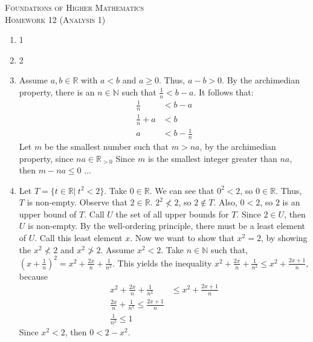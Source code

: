 \documentclass{article}
\theoremstyle{problem}
\theoremstyle{plain}
\theoremstyle{remark}
\begin{document}
\begin{center}
  \textsc{\Large Foundations of Higher Mathematics}\\[.3cm]
  \textsc{\Large Homework 12 (Analysis 1)}
\end{center}

\begin{enumerate}
\item 1
\item 2
\item 
  Assume $a,b \in \mathbb{R}$ with $a < b$ and $a \geq 0$. Thus, $a - b > 0$.
  By the archimedian property, there is an $n \in \mathbb{N}$ such that $\frac{1}{n} < b - a$.
  It follows that:
  \begin{align*}
    \frac{1}{n} &< b - a\\
    \frac{1}{n} + a &< b\\
    a &< b - \frac{1}{n}
  \end{align*}
  Let $m$ be the smallest number such that $m > na$, 
  by the archimedian property, since $na \in \mathbb{R}_{>0}$
  Since $m$ is the smallest integer greater than $na$, then $m - na \leq 0$
  ...
\item %
  Let $T = \{t \in \mathbb{R}|\ t^2 < 2\}$.
  Take $0 \in \mathbb{R}$. 
  We can see that $0^2 < 2$, so $0 \in \mathbb{R}$. 
  Thus, $T$ is non-empty.
  Observe that $2 \in \mathbb{R}$.
  $2^2 \not < 2$, so $2 \not \in T$.
  Also, $0 < 2$, so $2$ is an upper bound of $T$. 
  Call $U$ the set of all upper bounds for $T$.
  Since $2 \in U$, then $U$ is non-empty.
  By the well-ordering principle, there must be a least element of $U$.
  Call this least element $x$.
  Now we want to show that $x^2 = 2$, by showing the $x^2 \not < 2$ and $x^2 \not > 2$.
  Assume $x^2 < 2$.
  Take $n \in \mathbb{N}$ such that, $(x + \frac{1}{n})^2 = x^2 + \frac{2x}{n} + \frac{1}{n^2}$.
  This yields the inequality $x^2 + \frac{2x}{n} + \frac{1}{n^2} \leq x^2 + \frac{2x+1}{n}$, because
  \begin{align*}
    x^2 + \frac{2x}{n} + \frac{1}{n^2} &\leq x^2 + \frac{2x+1}{n}\\
    \frac{2x}{n} + \frac{1}{n^2} \leq \frac{2x+1}{n}\\
    \frac{1}{n^2} \leq 1
  \end{align*}  
  Since $x^2 < 2$, then $0 < 2 - x^2$.

\end{enumerate}
\end{document}
